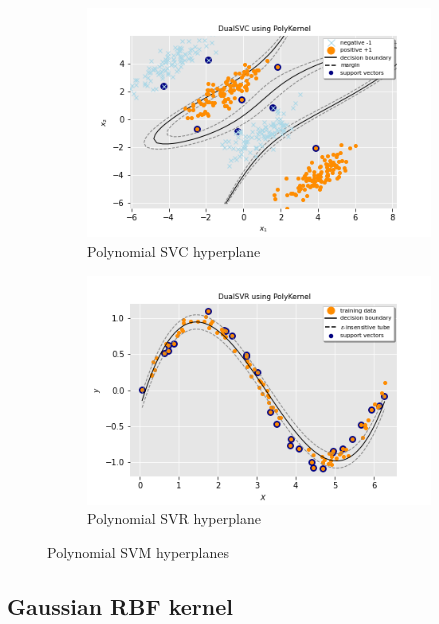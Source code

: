 \begin{figure}[h!]
	\centering
	\begin{subfigure}{.49\textwidth}
		\centering
		\includegraphics[width=\textwidth]{img/poly_dual_svc_hyperplane}
		\caption{Polynomial SVC hyperplane}
		\label{fig:poly_dual_svc_hyperplane}
	\end{subfigure}
	\begin{subfigure}{.49\textwidth}
		\centering
		\captionsetup{justification=centering}
		\includegraphics[width=\textwidth]{img/poly_dual_svr_hyperplane}
		\caption{Polynomial SVR hyperplane}
		\label{fig:poly_dual_svr_hyperplane}
	\end{subfigure}
\caption{Polynomial SVM hyperplanes}
\end{figure}

\subsection{Gaussian RBF kernel}

